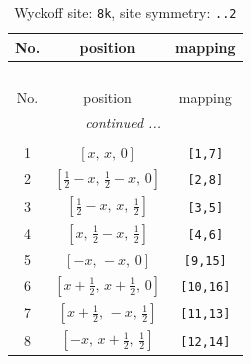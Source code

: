 \documentclass[fleqn,8pt]{jsarticle}
\begin{document}
\begin{longtable}{ccc}
\caption{Wyckoff site: {\tt 8k}, site symmetry: {\tt ..2}}
 \\
 \hline \hline
No. & position & mapping \\ \hline \endfirsthead

\multicolumn{2}{l}{\tablename\ \thetable{}} \\
 \hline \hline
No. & position & mapping \\ \hline \endhead

 \hline \hline
\multicolumn{2}{r}{\footnotesize\it continued ...} \\ \endfoot

 \hline \hline
\multicolumn{2}{r}{} \\ \endlastfoot

1 & $\left[ x,\, x,\, 0 \right]$ & {\tt [1,7]} \\ \hline
2 & $\left[ \frac{1}{2} - x,\, \frac{1}{2} - x,\, 0 \right]$ & {\tt [2,8]} \\ \hline
3 & $\left[ \frac{1}{2} - x,\, x,\, \frac{1}{2} \right]$ & {\tt [3,5]} \\ \hline
4 & $\left[ x,\, \frac{1}{2} - x,\, \frac{1}{2} \right]$ & {\tt [4,6]} \\ \hline
5 & $\left[ - x,\, - x,\, 0 \right]$ & {\tt [9,15]} \\ \hline
6 & $\left[ x + \frac{1}{2},\, x + \frac{1}{2},\, 0 \right]$ & {\tt [10,16]} \\ \hline
7 & $\left[ x + \frac{1}{2},\, - x,\, \frac{1}{2} \right]$ & {\tt [11,13]} \\ \hline
8 & $\left[ - x,\, x + \frac{1}{2},\, \frac{1}{2} \right]$ & {\tt [12,14]} \\
\end{longtable}
\renewcommand{\arraystretch}{1.2}
\end{document}
